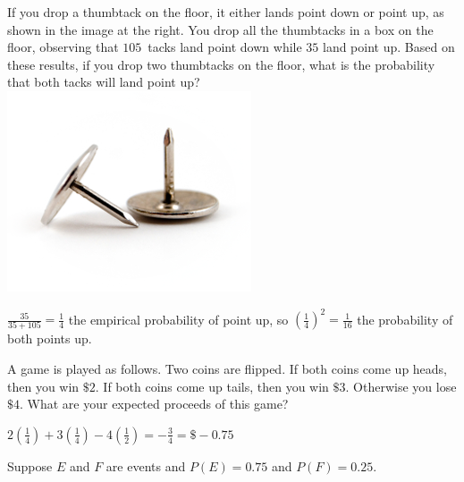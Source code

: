 \documentclass[answers,addpoints,12pt]{exam}
\begin{document}
\begin{questions}
\question[10]
\begin{multicols}{2}
If you drop a thumbtack on the floor, it either lands point down
or point up, as shown in the image at the right.
You drop all the thumbtacks in a box on the floor, observing that
$105$~tacks land point down while $35$ land point up.
Based on these results, if you drop two thumbtacks on the floor, what
is the probability that both tacks will land point up?
\columnbreak\\
\includegraphics[scale=.6]{Thumbtacks}
\end{multicols}
\begin{solution}
$\frac{35}{35+105}=\frac{1}{4}$ the empirical probability
of point up, so $\left(\frac{1}{4}\right)^2=\frac{1}{16}$
the probability of both points up.
\end{solution}

\question[10] A game is played as follows.
Two coins are flipped. If both coins come up
heads, then you win $\$2$. If both coins come
up tails, then you win $\$3$. 
Otherwise you lose $\$4$. What are your expected proceeds
of this game?
\begin{solution}
$2\left(\frac{1}{4}\right)+3\left(\frac{1}{4}\right)
-4\left(\frac{1}{2}\right)=-\frac{3}{4}=\$-0.75$
\end{solution}

\question[15] Suppose $E$ and $F$ are events
and $P\left(E\right)=0.75$ and $P\left(F\right)=0.25$.
\end{questions}
\end{document}

